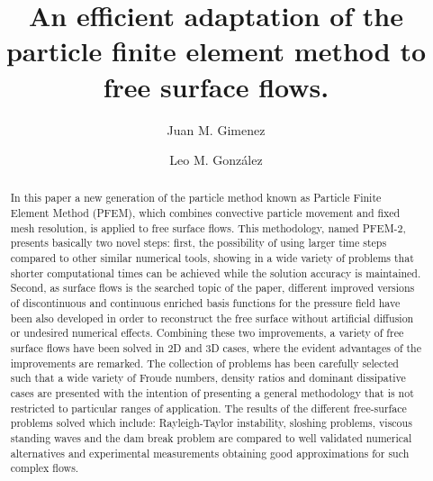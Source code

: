 \documentclass[review]{elsarticle}
\begin{document}
\begin{frontmatter}

\title{An efficient adaptation of the particle finite element method to free surface flows.}

\author{Juan M. Gimenez}
\address{CIMEC, Santa Fe, Argentina}
\author{Leo M. Gonz\'{a}lez}
\address{UPM, Madrid, Spain}

%
%
%

\begin{abstract}
In this paper a new generation of the particle method known as Particle Finite Element Method (PFEM), which combines convective particle movement and fixed mesh resolution, is applied to free surface flows. This methodology, named PFEM-2, presents basically two novel steps: first, the possibility of using larger time steps compared to other similar numerical tools, showing in a wide variety of problems that shorter computational times can be achieved while the solution accuracy is maintained. Second, as surface flows is the searched topic of the paper, different improved versions of discontinuous and continuous enriched basis functions for the pressure field have been also developed in order to reconstruct the free surface without artificial diffusion or undesired numerical effects. Combining these two improvements, a variety of free surface flows have been solved in 2D and 3D cases, where the evident advantages of the improvements are remarked. The collection of problems has been carefully selected such that a wide variety of Froude numbers, density ratios and dominant dissipative cases are presented with the intention of presenting a general methodology that is not restricted to particular ranges of application.
The results of the different free-surface problems solved which include: Rayleigh-Taylor instability, sloshing problems, viscous standing waves and the dam break problem are compared to well validated numerical alternatives and experimental measurements obtaining good approximations for such complex flows.
\end{abstract}


\end{frontmatter}
\end{document}
